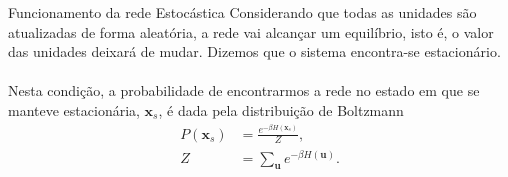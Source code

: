 \begin{frame}{Funcionamento da rede Estocástica}%
  \justifying%
  Considerando que todas as unidades são atualizadas de forma aleatória, a rede vai alcançar um equilíbrio, isto é, o valor das unidades deixará de mudar. Dizemos que o sistema encontra-se estacionário.
  \\~\\
  Nesta condição, a probabilidade de encontrarmos a rede no estado em que se manteve estacionária, $\mathrm{\mathbf{x}}_{s}$, é dada pela distribuição de Boltzmann
  \begin{align}%
    \label{eq:stoc-bd}%
    P(\mathbf{x}_{s}) &= \frac{e^{-\beta H(\mathbf{x}_{s})}}{Z}, \\
    Z & = \sum_{\mathbf{u}} e^{-\beta H(\mathbf{u})}.
  \end{align}
\end{frame}
